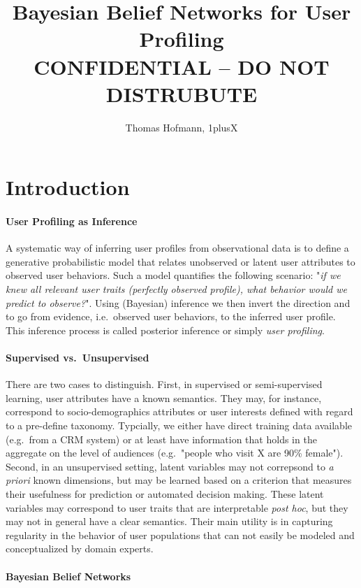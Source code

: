 \documentclass{article}
\title{Bayesian Belief Networks for User Profiling \\ {\large CONFIDENTIAL -- DO NOT DISTRUBUTE}}
\author{Thomas Hofmann, 1plusX}
\begin{document}
\maketitle 

\section{Introduction} 

\paragraph{User Profiling as Inference} 

A systematic way of inferring user profiles from observational data is to define a generative probabilistic model that relates unobserved or latent user attributes to observed user behaviors. Such a model quantifies the following scenario: "\textit{if we knew all relevant user traits (perfectly observed profile), what behavior would we predict to observe?}". Using (Bayesian) inference we then invert the direction and to go from evidence, i.e.~observed user behaviors, to the inferred user profile. This inference process is called posterior inference or simply \textit{user profiling}. 

\paragraph{Supervised vs.~Unsupervised} 

There are two cases to distinguish. First, in supervised or semi-supervised learning, user attributes have a known semantics. They may, for instance, correspond to socio-demographics attributes or user interests defined with regard to a pre-define taxonomy.  Typcially, we either have direct training data available (e.g.~from a CRM system) or at least have information that holds in the aggregate on the level of audiences (e.g.~"people who visit X are 90\% female"). Second, in an unsupervised setting, latent variables may not correpsond to \textit{a priori} known dimensions, but may be learned based on a criterion that measures their usefulness for prediction or automated decision making. These latent variables may correspond to user traits that are interpretable \textit{post hoc}, but they may not in general have a clear semantics. Their main utility is in capturing regularity in the behavior of user populations that can not easily be modeled and conceptualized by domain experts. 

\paragraph{Bayesian Belief Networks}
\end{document}
